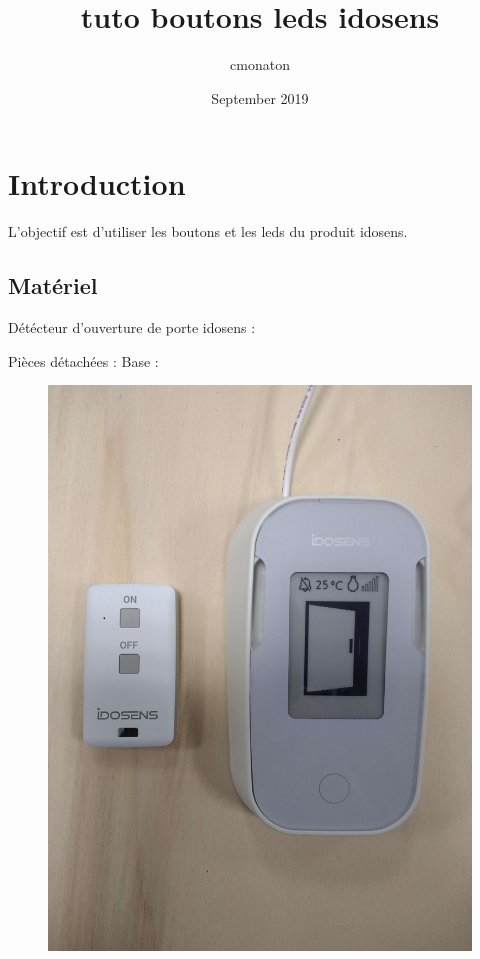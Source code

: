\documentclass{article}
\title{tuto boutons leds idosens}
\author{cmonaton }
\date{September 2019}
\begin{document}
\maketitle

\section{Introduction}
L'objectif est d'utiliser les boutons et les leds du produit idosens.

\subsection{Matériel}
Détécteur d'ouverture de porte idosens :


Pièces détachées :
Base :








\begin{figure}[H]
\begin{center}
\advance\leftskip-3cm
\advance\rightskip-3cm
\includegraphics[keepaspectratio=true,scale=0.05]{produit_complet.jpg}
\label{visina8}
\end{center}\end{figure}
\end{document}
